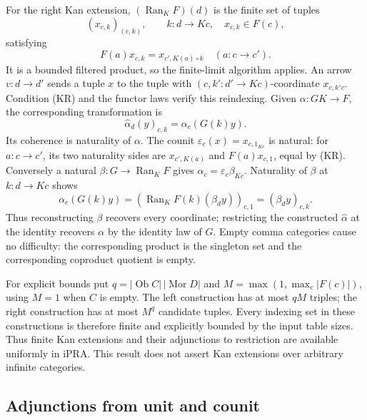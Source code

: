 For the right Kan extension, $(\operatorname{Ran}_K F)(d)$ is the finite set of
tuples
\[
 (x_{c,k})_{(c,k)},\qquad k:d\to Kc,\quad x_{c,k}\in F(c),
\]
satisfying
\[
 F(a)x_{c,k}=x_{c',K(a)\circ k}\quad(a:c\to c').       \tag{KR}
\]
It is a bounded filtered product, so the finite-limit algorithm applies.  An
arrow $v:d\to d'$ sends a tuple $x$ to the tuple with $(c,k':d'\to Kc)$-coordinate
$x_{c,k'v}$.  Condition (KR) and the functor laws verify this reindexing.
Given $\alpha:GK\to F$, the corresponding transformation is
\[
 \widehat\alpha_d(y)_{c,k}=\alpha_c(G(k)y).
\]
Its coherence is naturality of $\alpha$.  The counit
$\varepsilon_c(x)=x_{c,1_{Kc}}$ is natural: for $a:c\to c'$, its two
naturality sides are $x_{c',K(a)}$ and $F(a)x_{c,1}$, equal by (KR).
Conversely a natural $\beta:G\to\operatorname{Ran}_K F$ gives
$\alpha_c=\varepsilon_c\beta_{Kc}$.  Naturality of $\beta$ at $k:d\to Kc$
shows
\[
 \alpha_c(G(k)y)
 =(\operatorname{Ran}_K F(k)(\beta_d y))_{c,1}
 =(\beta_d y)_{c,k}.
\]
Thus reconstructing $\beta$ recovers every coordinate; restricting the
constructed $\widehat\alpha$ at the identity recovers $\alpha$ by the identity
law of $G$.  Empty comma categories cause no difficulty: the corresponding product
is the singleton set and the corresponding coproduct quotient is empty.

For explicit bounds put $q=|\operatorname{Ob}C|\,|\operatorname{Mor}D|$
and $M=\max(1,\max_c|F(c)|)$, using $M=1$ when $C$ is empty.
The left construction has at most $qM$ triples; the right construction has
at most $M^q$ candidate tuples.  Every indexing set in these constructions is
therefore finite and explicitly bounded by the input table sizes.  Thus finite Kan extensions and
their adjunctions to restriction are available uniformly in iPRA.  This result
does not assert Kan extensions over arbitrary infinite categories.

\subsection{Adjunctions from unit and counit}

